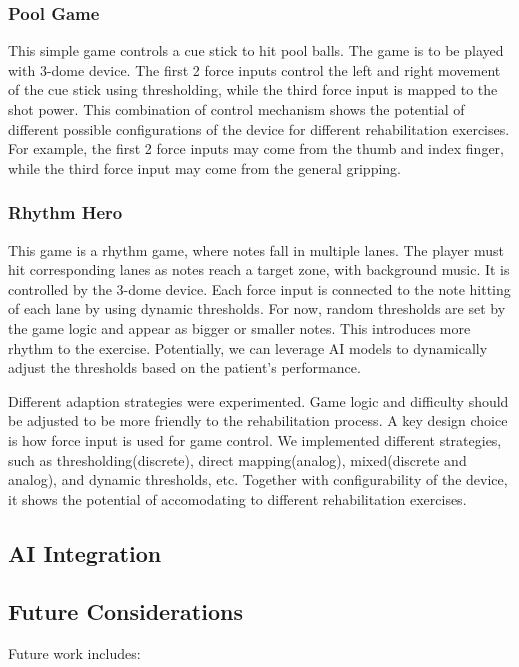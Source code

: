 \subsubsection{Pool Game}
This simple game controls a cue stick to hit pool balls. The game is to be played with 3-dome device. 
The first 2 force inputs control the left and right movement of the cue stick using thresholding, while 
the third force input is mapped to the shot power. This combination of control mechanism shows the potential of
different possible configurations of the device for different rehabilitation exercises. 
For example, the first 2 force inputs may come from the thumb and index finger, while the third force input may come from the general gripping.

\subsubsection{Rhythm Hero}
This game is a rhythm game, where notes fall in multiple lanes. The player must hit corresponding lanes as notes reach a target zone, with background music.
It is controlled by the 3-dome device. Each force input is connected to the note hitting of each lane by using dynamic thresholds. 
For now, random thresholds are set by the game logic and appear as bigger or smaller notes. This introduces more rhythm to the exercise.
Potentially, we can leverage AI models to dynamically adjust the thresholds based on the patient's performance. 

Different adaption strategies were experimented. Game logic and difficulty should be adjusted to be more friendly to the rehabilitation process. 
A key design choice is how force input is used for game control. We implemented different strategies, 
such as thresholding(discrete), direct mapping(analog), mixed(discrete and analog), and dynamic thresholds, etc. 
Together with configurability of the device, it shows the potential of accomodating to different rehabilitation exercises.


\subsection{AI Integration}




\subsection{Future Considerations}

Future work includes:

